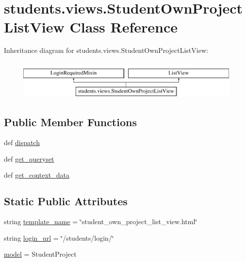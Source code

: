 \hypertarget{classstudents_1_1views_1_1_student_own_project_list_view}{\section{students.\-views.\-Student\-Own\-Project\-List\-View Class Reference}
\label{classstudents_1_1views_1_1_student_own_project_list_view}
}
Inheritance diagram for students.\-views.\-Student\-Own\-Project\-List\-View\-:\begin{figure}[H]
\begin{center}
\leavevmode
\includegraphics[height=2.000000cm]{classstudents_1_1views_1_1_student_own_project_list_view}
\end{center}
\end{figure}
\subsection*{Public Member Functions}
\begin{DoxyCompactItemize}
\item 
def \hyperlink{classstudents_1_1views_1_1_student_own_project_list_view_a1914d88da030233e5bde8e9eaa672d1f}{dispatch}
\item 
def \hyperlink{classstudents_1_1views_1_1_student_own_project_list_view_a3a005eb9167f0ce90795a497f47192df}{get\-\_\-queryset}
\item 
def \hyperlink{classstudents_1_1views_1_1_student_own_project_list_view_ac4d1e0b97acee38b09e4afa6f19b5183}{get\-\_\-context\-\_\-data}
\end{DoxyCompactItemize}
\subsection*{Static Public Attributes}
\begin{DoxyCompactItemize}
\item 
string \hyperlink{classstudents_1_1views_1_1_student_own_project_list_view_af9ad46ae5b73ff58b70afb6f463dcd28}{template\-\_\-name} = \char`\"{}student\-\_\-own\-\_\-project\-\_\-list\-\_\-view.\-html\char`\"{}
\item 
string \hyperlink{classstudents_1_1views_1_1_student_own_project_list_view_ab68e4688743c572f94ce263b0d25f25c}{login\-\_\-url} = \char`\"{}/students/login/\char`\"{}
\item 
\hyperlink{classstudents_1_1views_1_1_student_own_project_list_view_ab24de360971615cba8e75d65a835ceaf}{model} = Student\-Project
\end{DoxyCompactItemize}


